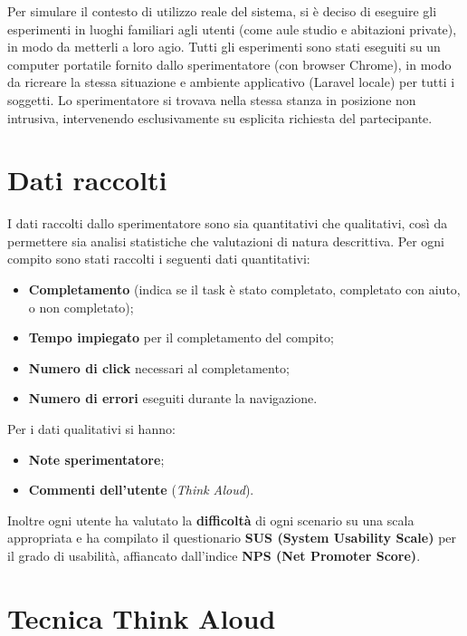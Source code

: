 Per simulare il contesto di utilizzo reale del sistema, si è deciso di eseguire gli esperimenti in luoghi familiari agli utenti (come aule studio e abitazioni private), in modo da metterli a loro agio.
Tutti gli esperimenti sono stati eseguiti su un computer portatile fornito dallo sperimentatore (con browser Chrome), in modo da ricreare la stessa situazione e ambiente applicativo (Laravel locale) per tutti i soggetti.
Lo sperimentatore si trovava nella stessa stanza in posizione non intrusiva, intervenendo esclusivamente su esplicita richiesta del partecipante.

\section{Dati raccolti}

I dati raccolti dallo sperimentatore sono sia quantitativi che qualitativi, così da permettere sia analisi statistiche che valutazioni di natura descrittiva.
Per ogni compito sono stati raccolti i seguenti dati quantitativi:
\begin{itemize}
    \item \textbf{Completamento} (indica se il task è stato completato, completato con aiuto, o non completato);
    \item \textbf{Tempo impiegato} per il completamento del compito;
    \item \textbf{Numero di click} necessari al completamento;
    \item \textbf{Numero di errori} eseguiti durante la navigazione.
\end{itemize}

Per i dati qualitativi si hanno:
\begin{itemize}
    \item \textbf{Note sperimentatore};
    \item \textbf{Commenti dell'utente} (\textit{Think Aloud}).
\end{itemize}

Inoltre ogni utente ha valutato la \textbf{difficoltà} di ogni scenario su una scala appropriata e ha compilato il questionario \textbf{SUS (System Usability Scale)} per il grado di usabilità, affiancato dall'indice \textbf{NPS (Net Promoter Score)}.

\section{Tecnica Think Aloud}
\label{sec:think_aloud}

